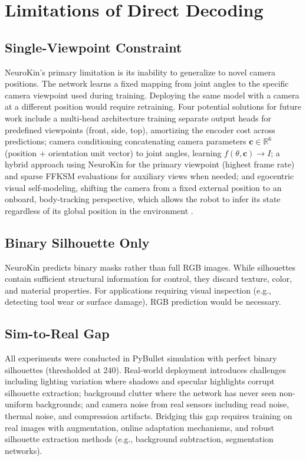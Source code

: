 \documentclass[12pt,a4paper,oneside]{report}
\begin{document}
\section{Limitations of Direct Decoding}
\subsection{Single-Viewpoint Constraint}
\label{subsec:single_viewpoint_constraint}

NeuroKin's primary limitation is its inability to generalize to novel camera positions. The network learns a fixed mapping from joint angles to the specific camera viewpoint used during training. Deploying the same model with a camera at a different position would require retraining. Four potential solutions for future work include a multi-head architecture training separate output heads for predefined viewpoints (front, side, top), amortizing the encoder cost across predictions; camera conditioning concatenating camera parameters $\mathbf{c} \in \mathbb{R}^6$ (position + orientation unit vector) to joint angles, learning $f(\theta, \mathbf{c}) \rightarrow I$; a hybrid approach using NeuroKin for the primary viewpoint (highest frame rate) and sparse FFKSM evaluations for auxiliary views when needed; and egocentric visual self-modeling, shifting the camera from a fixed external position to an onboard, body-tracking perspective, which allows the robot to infer its state regardless of its global position in the environment \cite{hu2024egocentric}.
\subsection{Binary Silhouette Only}
\label{subsec:binary_silhouette_only}

NeuroKin predicts binary masks rather than full RGB images. While silhouettes contain sufficient structural information for control, they discard texture, color, and material properties. For applications requiring visual inspection (e.g., detecting tool wear or surface damage), RGB prediction would be necessary.
\subsection{Sim-to-Real Gap}
\label{subsec:sim_to_real_gap}

All experiments were conducted in PyBullet simulation with perfect binary silhouettes (thresholded at 240). Real-world deployment introduces challenges including lighting variation where shadows and specular highlights corrupt silhouette extraction; background clutter where the network has never seen non-uniform backgrounds; and camera noise from real sensors including read noise, thermal noise, and compression artifacts. Bridging this gap requires training on real images with augmentation, online adaptation mechanisms, and robust silhouette extraction methods (e.g., background subtraction, segmentation networks).
\end{document}
